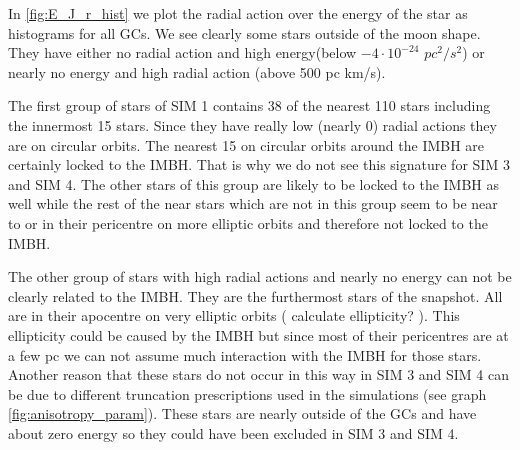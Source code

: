 In \ref{fig:E_J_r_hist} we plot the radial action over the energy of the star as histograms for all \acp{GC}. We see clearly some stars outside of the moon shape. They have either no radial action and high energy(below \(-4 \cdot10^{-24}\) \(pc^2/s^2\)) or nearly no energy and high radial action (above 500 pc km/s). 
\par The first group of stars of SIM 1 contains 38 of the nearest 110 stars including the innermost 15 stars. Since they have really low (nearly 0) radial actions they are on circular orbits. The nearest 15 on circular orbits around the \ac{IMBH} are certainly locked to the \ac{IMBH}. That is why we do not see this signature for SIM 3 and SIM 4. The other stars of this group are likely to be locked to the \ac{IMBH} as well while the rest of the near stars which are not in this group seem to be near to or in their pericentre on more elliptic orbits and therefore not locked to the \ac{IMBH}. 
\par The other group of stars with high radial actions and nearly no energy can not be clearly related to the \ac{IMBH}. They are the furthermost stars of the snapshot. All are in their apocentre on very elliptic orbits (\color{red} calculate ellipticity? \color{black}). This ellipticity could be caused by the \ac{IMBH} but since most of their pericentres are at a few pc we can not assume much interaction with the \ac{IMBH} for those stars. Another reason that these stars do not occur in this way in SIM 3 and SIM 4 can be due to different truncation prescriptions used in the simulations (see graph \ref{fig:anisotropy_param}). These stars are nearly outside of the \acp{GC} and have about zero energy so they could have been excluded in SIM 3 and SIM 4. 



